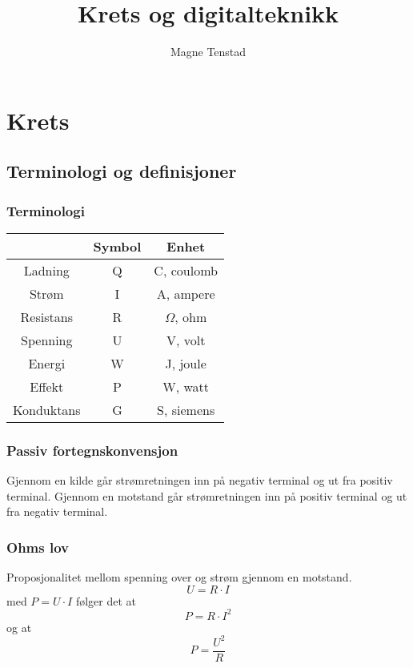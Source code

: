 \documentclass{article}
\title{Krets og digitalteknikk}
\author{Magne Tenstad}
\begin{document}
\maketitle

\clearpage

\tableofcontents

\clearpage

\section{Krets}


\subsection{Terminologi og definisjoner}


\subsubsection{Terminologi}
\begin{table}[h]
    \centering
    \begin{tabular}{c|c|c}
                    & Symbol & Enhet \\
        \hline
        Ladning     & Q & C, coulomb \\
        Strøm       & I & A, ampere \\
        Resistans   & R & $\Omega$, ohm \\
        Spenning    & U & V, volt \\
        Energi      & W & J, joule \\
        Effekt      & P & W, watt \\
        Konduktans  & G & S, siemens
    \end{tabular}
\end{table}


\subsubsection{Passiv fortegnskonvensjon}
Gjennom en kilde går strømretningen inn på negativ terminal og ut fra positiv terminal. Gjennom en motstand går strømretningen inn på positiv terminal og ut fra negativ terminal.


\subsubsection{Ohms lov}
Proposjonalitet mellom spenning over og strøm gjennom en motstand.
\[U = R \cdot I\]
med $P = U \cdot I$ følger det at
\[P = R \cdot I^2\]
og at
\[P = \frac{U^2}{R}\]
\end{document}
